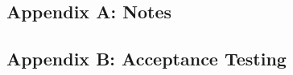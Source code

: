 \documentclass[12pt]{article}
\begin{document}

\subsection{Appendix A: Notes}

\subsection{Appendix B: Acceptance Testing}
\end{document}

